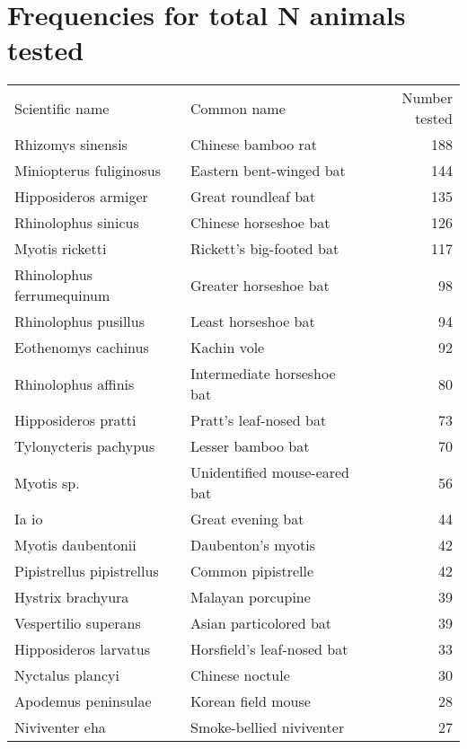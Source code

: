 \documentclass[11pt,article,oneside]{article}
\begin{document}
\section{Frequencies for total N animals
tested}\label{frequencies-for-total-n-animals-tested}

\begin{longtable}[c]{@{}llr@{}}
\toprule\addlinespace
Scientific name & Common name & Number tested
\\\addlinespace
\midrule\endhead
Rhizomys sinensis & Chinese bamboo rat & 188
\\\addlinespace
Miniopterus fuliginosus & Eastern bent-winged bat & 144
\\\addlinespace
Hipposideros armiger & Great roundleaf bat & 135
\\\addlinespace
Rhinolophus sinicus & Chinese horseshoe bat & 126
\\\addlinespace
Myotis ricketti & Rickett's big-footed bat & 117
\\\addlinespace
Rhinolophus ferrumequinum & Greater horseshoe bat & 98
\\\addlinespace
Rhinolophus pusillus & Least horseshoe bat & 94
\\\addlinespace
Eothenomys cachinus & Kachin vole & 92
\\\addlinespace
Rhinolophus affinis & Intermediate horseshoe bat & 80
\\\addlinespace
Hipposideros pratti & Pratt's leaf-nosed bat & 73
\\\addlinespace
Tylonycteris pachypus & Lesser bamboo bat & 70
\\\addlinespace
Myotis sp. & Unidentified mouse-eared bat & 56
\\\addlinespace
Ia io & Great evening bat & 44
\\\addlinespace
Myotis daubentonii & Daubenton's myotis & 42
\\\addlinespace
Pipistrellus pipistrellus & Common pipistrelle & 42
\\\addlinespace
Hystrix brachyura & Malayan porcupine & 39
\\\addlinespace
Vespertilio superans & Asian particolored bat & 39
\\\addlinespace
Hipposideros larvatus & Horsfield's leaf-nosed bat & 33
\\\addlinespace
Nyctalus plancyi & Chinese noctule & 30
\\\addlinespace
Apodemus peninsulae & Korean field mouse & 28
\\\addlinespace
Niviventer eha & Smoke-bellied niviventer & 27

\end{longtable}
\end{document}

